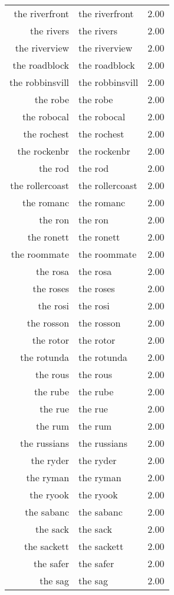 \begin{table}[ht]
\begin{tabular}{rlr}
  the riverfront & the riverfront & 2.00 \\ 
  the rivers & the rivers & 2.00 \\ 
  the riverview & the riverview & 2.00 \\ 
  the roadblock & the roadblock & 2.00 \\ 
  the robbinsvill & the robbinsvill & 2.00 \\ 
  the robe & the robe & 2.00 \\ 
  the robocal & the robocal & 2.00 \\ 
  the rochest & the rochest & 2.00 \\ 
  the rockenbr & the rockenbr & 2.00 \\ 
  the rod & the rod & 2.00 \\ 
  the rollercoast & the rollercoast & 2.00 \\ 
  the romanc & the romanc & 2.00 \\ 
  the ron & the ron & 2.00 \\ 
  the ronett & the ronett & 2.00 \\ 
  the roommate & the roommate & 2.00 \\ 
  the rosa & the rosa & 2.00 \\ 
  the roses & the roses & 2.00 \\ 
  the rosi & the rosi & 2.00 \\ 
  the rosson & the rosson & 2.00 \\ 
  the rotor & the rotor & 2.00 \\ 
  the rotunda & the rotunda & 2.00 \\ 
  the rous & the rous & 2.00 \\ 
  the rube & the rube & 2.00 \\ 
  the rue & the rue & 2.00 \\ 
  the rum & the rum & 2.00 \\ 
  the russians & the russians & 2.00 \\ 
  the ryder & the ryder & 2.00 \\ 
  the ryman & the ryman & 2.00 \\ 
  the ryook & the ryook & 2.00 \\ 
  the sabanc & the sabanc & 2.00 \\ 
  the sack & the sack & 2.00 \\ 
  the sackett & the sackett & 2.00 \\ 
  the safer & the safer & 2.00 \\ 
  the sag & the sag & 2.00 \\ 

\end{tabular}
\end{table}
